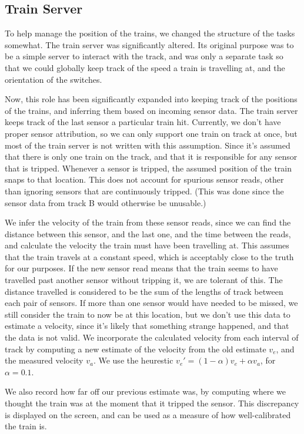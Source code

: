 \documentclass[titlepage]{article}
\begin{document}
\subsection{Train Server}
To help manage the position of the trains, we changed the structure of the
tasks somewhat.
The train server was significantly altered.
Its original purpose was to be a simple server to interact with the track,
and was only a separate task so that we could globally keep track of the
speed a train is travelling at, and the orientation of the switches.

Now, this role has been significantly expanded into keeping track of the
positions of the trains, and inferring them based on incoming sensor data.
The train server keeps track of the last sensor a particular train hit.
Currently, we don't have proper sensor attribution, so we can only support
one train on track at once, but most of the train server is not written with
this assumption.
Since it's assumed that there is only one train on the track, and that
it is responsible for any sensor that is tripped.
Whenever a sensor is tripped, the assumed position of the train snaps to that
location.
This does not account for spurious sensor reads, other than ignoring
sensors that are continuously tripped.
(This was done since the sensor data from track B would otherwise be unusable.)

We infer the velocity of the train from these sensor reads, since we can
find the distance between this sensor, and the last one, and the time between
the reads, and calculate the velocity the train must have been travelling at.
This assumes that the train travels at a constant speed, which is acceptably
close to the truth for our purposes.
If the new sensor read means that the train seems to have travelled past
another sensor without tripping it, we are tolerant of this.
The distance travelled is considered to be the sum of the lengths of track
between each pair of sensors.
If more than one sensor would have needed to be missed, we still consider the
train to now be at this location, but we don't use this data to estimate
a velocity, since it's likely that something strange happened, and that
the data is not valid.
We incorporate the calculated velocity from each interval of track by computing
a new estimate of the velocity from the old estimate $v_e$, and the measured
velocity $v_a$.
We use the heurestic $v_e' = (1 - \alpha) v_e + \alpha v_a$, for $\alpha = 0.1$.

We also record how far off our previous estimate was, by computing where
we thought the train was at the moment that it tripped the sensor.
This discrepancy is displayed on the screen, and can be used as a measure of
how well-calibrated the train is.
\end{document}
